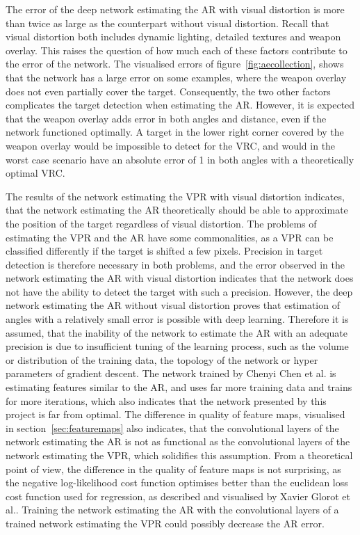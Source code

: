The error of the deep network estimating the AR with visual distortion is more than twice as large as the counterpart without visual distortion. Recall that visual distortion both includes dynamic lighting, detailed textures and weapon overlay. This raises the question of how much each of these factors contribute to the error of the network. The visualised errors of figure~\ref{fig:aecollection}, shows that the network has a large error on some examples, where the weapon overlay does not even partially cover the target. Consequently, the two other factors complicates the target detection when estimating the AR. However, it is expected that the weapon overlay adds error in both angles and distance, even if the network functioned optimally. A target in the lower right corner covered by the weapon overlay would be impossible to detect for the VRC, and would in the worst case scenario have an absolute error of 1 in both angles with a theoretically optimal VRC.

The results of the network estimating the VPR with visual distortion indicates, that the network estimating the AR theoretically should be able to approximate the position of the target regardless of visual distortion. The problems of estimating the VPR and the AR have some commonalities, as a VPR can be classified differently if the target is shifted a few pixels. Precision in target detection is therefore necessary in both problems, and the error observed in the network estimating the AR with visual distortion indicates that the network does not have the ability to detect the target with such a precision. However, the deep network estimating the AR without visual distortion proves that estimation of angles with a relatively small error is possible with deep learning. Therefore it is assumed, that the inability of the network  to estimate the AR with an adequate precision is due to insufficient tuning of the learning process, such as the volume or distribution of the training data, the topology of the network or hyper parameters of gradient descent. The network trained by Chenyi Chen et al.\cite{chen} is estimating features similar to the AR, and uses far more training data and trains for more iterations, which also indicates that the network presented by this project is far from optimal. The difference in quality of feature maps, visualised in section~\ref{sec:featuremaps} also indicates, that the convolutional layers of the network estimating the AR is not as functional as the convolutional layers of the network estimating the VPR, which solidifies this assumption. From a theoretical point of view, the difference in the quality of feature maps is not surprising, as the negative log-likelihood cost function optimises better than the euclidean loss cost function used for regression, as described and visualised by Xavier Glorot et al.\cite{DBLP:journals/jmlr/GlorotB10}. Training the network estimating the AR with the convolutional layers of a trained network estimating the VPR could possibly decrease the AR error.

